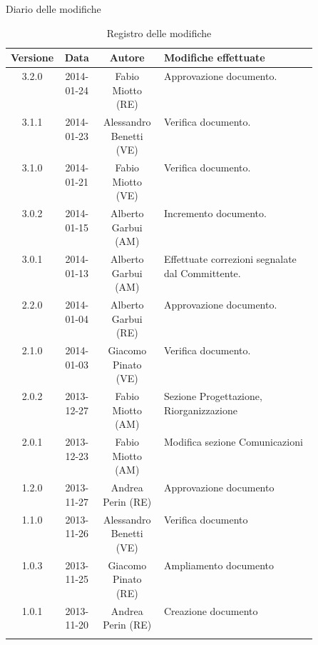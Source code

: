 
\newpage
Diario delle modifiche
\begin{center}
\begin{longtable}{|c|c|c|p{0.5\linewidth}|}
\toprule
\textbf{Versione} & \textbf{Data} & \textbf{Autore} & \textbf{Modifiche effettuate}\\

\midrule
3.2.0 & 2014-01-24 & Fabio Miotto (RE) & Approvazione documento.\\
\midrule
3.1.1 & 2014-01-23 & Alessandro Benetti (VE) & Verifica documento.\\
\midrule
3.1.0 & 2014-01-21  & Fabio Miotto (VE) & Verifica documento.\\
\midrule
3.0.2 & 2014-01-15 	& Alberto Garbui (AM) & Incremento documento.\\
\midrule
3.0.1 & 2014-01-13	& Alberto Garbui (AM) & Effettuate correzioni segnalate dal Committente.\\
\midrule
2.2.0 &	2014-01-04	& Alberto Garbui (RE) & Approvazione documento.\\ 
\midrule
2.1.0 &	2014-01-03	& Giacomo Pinato (VE) & Verifica documento.\\ 
\midrule
2.0.2 & 2013-12-27 & Fabio Miotto (AM) & Sezione Progettazione, Riorganizzazione\\
\midrule
2.0.1 & 2013-12-23 & Fabio Miotto (AM) & Modifica sezione Comunicazioni\\
\midrule
1.2.0 & 2013-11-27 & Andrea Perin (RE) & Approvazione documento\\
\midrule
1.1.0 & 2013-11-26 & Alessandro Benetti (VE) & Verifica documento\\
\midrule
1.0.3 & 2013-11-25 & Giacomo Pinato (RE) & Ampliamento documento\\
\midrule
1.0.1 & 2013-11-20 & Andrea Perin (RE) & Creazione documento\\

\bottomrule
\caption{Registro delle modifiche}
\label{tab:changelog}
\end{longtable}
\end{center}

\newpage
\tableofcontents


